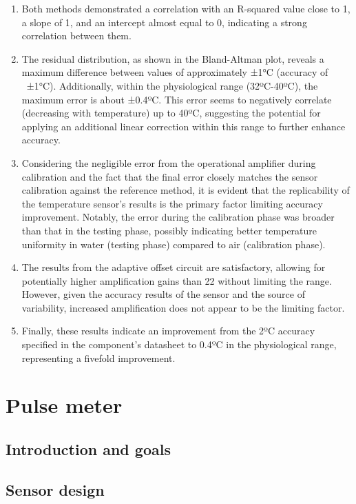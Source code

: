 \documentclass[conference]{IEEEtran}
\begin{document}
      \begin{enumerate}
      \item Both methods demonstrated a correlation with an R-squared value close to 1, a slope of 1, and an intercept almost equal to 0, indicating a strong correlation between them.
      \item The residual distribution, as shown in the Bland-Altman plot, reveals a maximum difference between values of approximately ±1°C (accuracy of ~±1°C). Additionally, within the physiological range (32ºC-40ºC), the maximum error is about ±0.4ºC. This error seems to negatively correlate (decreasing with temperature) up to 40ºC, suggesting the potential for applying an additional linear correction within this range to further enhance accuracy.
      \item Considering the negligible error from the operational amplifier during calibration and the fact that the final error closely matches the sensor calibration against the reference method, it is evident that the replicability of the temperature sensor's results is the primary factor limiting accuracy improvement. Notably, the error during the calibration phase was broader than that in the testing phase, possibly indicating better temperature uniformity in water (testing phase) compared to air (calibration phase).
      \item The results from the adaptive offset circuit are satisfactory, allowing for potentially higher amplification gains than 22 without limiting the range. However, given the accuracy results of the sensor and the source of variability, increased amplification does not appear to be the limiting factor.
      \item Finally, these results indicate an improvement from the 2ºC accuracy specified in the component's datasheet to 0.4ºC in the physiological range, representing a fivefold improvement.
      \end{enumerate}

\section{Pulse meter} %
   \subsection{Introduction and goals}
   \subsection{Sensor design}
\end{document}
